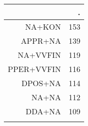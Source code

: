 \begin{tabular}{rr}
  \lsptoprule
 & . \\ 
  \midrule
NA+KON & 153 \\ 
  APPR+NA & 139 \\ 
  NA+VVFIN & 119 \\ 
  PPER+VVFIN & 116 \\ 
  DPOS+NA & 114 \\ 
  NA+NA & 112 \\ 
  DDA+NA & 109 \\ 
   \lspbottomrule
\end{tabular}
